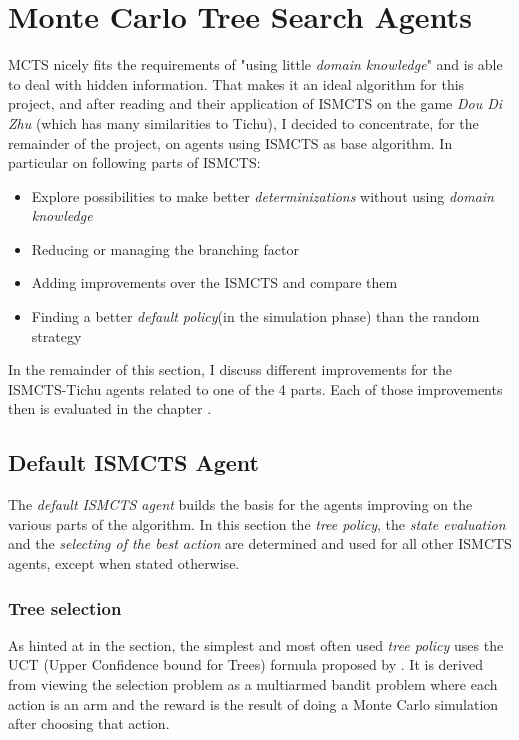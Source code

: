 \section{Monte Carlo Tree Search Agents}
MCTS nicely fits the requirements of "using little \textit{domain knowledge}" and is able to deal with hidden information. That makes it an ideal algorithm for this project, and after reading \cite{surveymcts, ismcts, whitehouse14} and their application of ISMCTS on the game \textit{Dou Di Zhu} (which has many similarities to Tichu), I decided to concentrate, for the remainder of the project, on agents using ISMCTS as base algorithm.
In particular on following parts of ISMCTS:
\begin{itemize}
    \vspace{-10px}
    \item Explore possibilities to make better \textit{determinizations} without using \textit{domain knowledge}
    \item Reducing or managing the branching factor
    \item Adding improvements over the ISMCTS and compare them
    \item Finding a better \textit{default policy}(in the simulation phase) than the random strategy
\end{itemize}

In the remainder of this section, I discuss different improvements for the ISMCTS-Tichu agents related to one of the 4 parts. Each of those improvements then is evaluated in the chapter .

\subsection{Default ISMCTS Agent}
The \textit{default ISMCTS agent} builds the basis for the agents improving on the various parts of the algorithm. In this section the \textit{tree policy}, the \textit{state evaluation} and the \textit{selecting of the best action} are determined and used for all other ISMCTS agents, except when stated otherwise.

\subsubsection{Tree selection}
\label{sec:uct}
As hinted at in the \textit{} section, the simplest and most often used \textit{tree policy} uses the UCT (Upper Confidence bound for Trees) formula proposed by \cite{uct}.
It is derived from viewing the selection problem as a multiarmed bandit problem where each action is an arm and the reward is the result of doing a Monte Carlo simulation after choosing that action.

